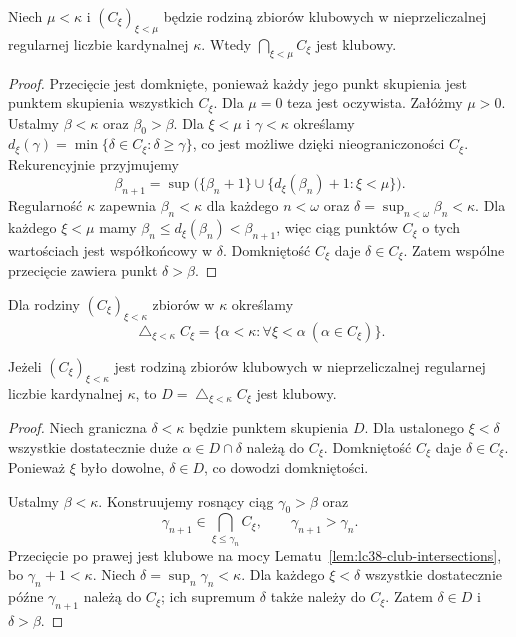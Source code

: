 \begin{lemat}
\label{lem:lc38-club-intersections}
Niech $\mu<\kappa$ i $(C_\xi)_{\xi<\mu}$
będzie rodziną zbiorów klubowych w
nieprzeliczalnej regularnej liczbie kardynalnej $\kappa$.
Wtedy $\bigcap_{\xi<\mu}C_\xi$ jest klubowy.
\end{lemat}
\begin{proof}
Przecięcie jest domknięte, ponieważ
każdy jego punkt skupienia jest
punktem skupienia wszystkich $C_\xi$.
Dla $\mu=0$ teza jest oczywista.
Załóżmy $\mu>0$.
Ustalmy $\beta<\kappa$ oraz
$\beta_0>\beta$. Dla $\xi<\mu$
i $\gamma<\kappa$ określamy
$d_\xi(\gamma)=
 \min\{\delta\in C_\xi:\delta\ge\gamma\}$,
co jest możliwe dzięki
nieograniczoności $C_\xi$.
Rekurencyjnie przyjmujemy
\[
 \beta_{n+1}=
 \sup\bigl(\{\beta_n+1\}\cup
       \{d_\xi(\beta_n)+1:\xi<\mu\}\bigr).
\]
Regularność $\kappa$ zapewnia
$\beta_n<\kappa$ dla każdego $n<\omega$
oraz $\delta=\sup_{n<\omega}\beta_n<\kappa$.
Dla każdego $\xi<\mu$ mamy
$\beta_n\le d_\xi(\beta_n)<\beta_{n+1}$,
więc ciąg punktów $C_\xi$ o tych
wartościach jest współkońcowy w $\delta$.
Domkniętość $C_\xi$ daje
$\delta\in C_\xi$.
Zatem wspólne przecięcie
zawiera punkt $\delta>\beta$.
\end{proof}

\begin{definicja}
\label{def:lc38-diagonal}
Dla rodziny $(C_\xi)_{\xi<\kappa}$
zbiorów w $\kappa$ określamy
\[
 \mathop{\triangle}_{\xi<\kappa}C_\xi
 =\{\alpha<\kappa:
       \forall\xi<\alpha\ (\alpha\in C_\xi)\}.
\]
\end{definicja}

\begin{lemat}
\label{lem:lc38-diagonal-club}
Jeżeli $(C_\xi)_{\xi<\kappa}$
jest rodziną zbiorów klubowych
w nieprzeliczalnej regularnej liczbie kardynalnej $\kappa$,
to $D=\mathop{\triangle}_{\xi<\kappa}C_\xi$
jest klubowy.
\end{lemat}
\begin{proof}
Niech graniczna $\delta<\kappa$
będzie punktem skupienia $D$.
Dla ustalonego $\xi<\delta$
wszystkie dostatecznie duże
$\alpha\in D\cap\delta$ należą do
$C_\xi$. Domkniętość $C_\xi$
daje $\delta\in C_\xi$.
Ponieważ $\xi$ było dowolne,
$\delta\in D$, co dowodzi domkniętości.

Ustalmy $\beta<\kappa$.
Konstruujemy rosnący ciąg
$\gamma_0>\beta$ oraz
\[
 \gamma_{n+1}\in
 \bigcap_{\xi\le\gamma_n}C_\xi,\qquad
 \gamma_{n+1}>\gamma_n.
\]
Przecięcie po prawej jest klubowe
na mocy Lematu~\ref{lem:lc38-club-intersections},
bo $\gamma_n+1<\kappa$.
Niech $\delta=\sup_n\gamma_n<\kappa$.
Dla każdego $\xi<\delta$
wszystkie dostatecznie późne
$\gamma_{n+1}$ należą do $C_\xi$;
ich supremum $\delta$ także należy
do $C_\xi$. Zatem $\delta\in D$
i $\delta>\beta$.
\end{proof}

